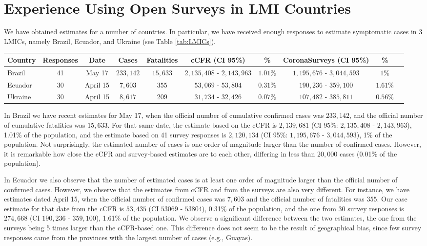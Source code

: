 \documentclass[sigconf,authordraft]{acmart}
\begin{document}
\section{Experience Using Open Surveys in LMI Countries}

We have obtained estimates for a number of countries. In particular, we have received enough responses to estimate symptomatic cases in 3 LMICs, namely Brazil, Ecuador, and Ukraine (see Table \ref{tab:LMICs}). 

\begin{table*}
    \centering
    \begin{tabular}{|l|c|c|c|c|c|c|c|c|c|}
    \hline
 Country    &  Responses & Date       & Cases & Fatalities & cCFR (CI 95\%) & \% & CoronaSurveys (CI 95\%) & \% \\ 
 \hline
  Brazil     & 41  & May 17 & $233,142$ & $15,633$ & $2,135,408$ - $2,143,963$ & $1.01\%$ & $1,195,676$ - $3,044,593$ & $1\%$ \\
  Ecuador    & 30  & April 15 & $7,603$ & $355$ & $53,069$ - $53,804$ & $0.31\%$ & $190,236$ - $359,100$ & $1.61\%$ \\
   Ukraine    & 30  & April 15 & $8,617$ & $209$ & $31,734$ - $32,426$ & $0.07\%$ & $107,482$ - $385,811$ & $0.56\%$ \\ \hline
    \end{tabular}
    \caption{Summary of estimates for Brazil, Ecuador and Ukraine. Cases and Fatalities correspond to the official data on that day, while cCFT and CoronaSurveys are estimates. }
    \label{tab:LMICs}
\end{table*}

In Brazil we have recent estimates for May 17, when the official number of cumulative confirmed cases 
was $233,142$, and the official number of cumulative fatalities was $15,633$. For that same date, the estimate based on the cCFR is $2,139,681$ (CI 95\%: $2,135,408$ - $2,143,963$), 1.01\% of the population, and the estimate based on 41 survey responses is $2,120,134$ (CI  95\%: $1,195,676$ - $3,044,593$), 1\% of the population. Not surprisingly, the estimated number of cases is one order of magnitude larger than the number of confirmed cases. However, it is remarkable how close the cCFR and survey-based estimates are to each other, differing in less than $20,000$ cases (0.01\% of the population).

In Ecuador we also observe that the number of estimated cases is at least one order of magnitude larger than the official number of confirmed cases. However, we observe that the estimates from cCFR and from the surveys are also very different. For instance, we have estimates dated April 15, when the official number of confirmed cases was $7,603$ and the official number of fatalities was $355$. Our case estimate for that date from the cCFR is $53,435$ (CI $53069$ - $53804$), 0.31\% of the population, and the one from 30 survey responses is $274,668$ (CI $190,236$ - $359,100$), 1.61\% of the population. We observe a significant difference between the two estimates, the one from the surveys being 5 times larger than the cCFR-based one. This difference does not seem to be the result of geographical bias, since few survey responses came from the provinces with the largest number of cases (e.g., Guayas).
\end{document}
